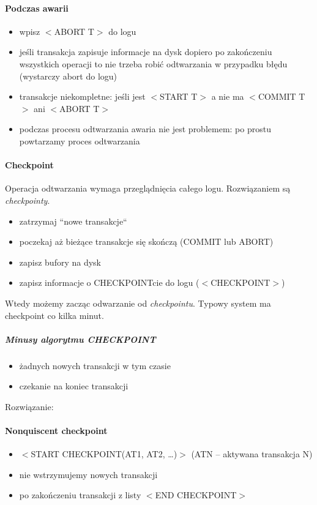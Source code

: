 \documentclass[12pt]{article}
\begin{document}
\paragraph{Podczas awarii}
\begin{itemize}
  \item wpisz $<$ABORT T$>$ do logu
  \item jeśli transakcja zapisuje informacje na dysk dopiero po zakończeniu
     wszystkich operacji to nie trzeba robić odtwarzania w przypadku błędu
     (wystarczy abort do logu)
  \item transakcje niekompletne: jeśli jest $<$START T$>$ a nie ma $<$COMMIT T$>$ ani $<$ABORT T$>$
  \item podczas procesu odtwarzania awaria nie jest problemem: po prostu powtarzamy proces
     odtwarzania
\end{itemize}

\paragraph{Checkpoint}
Operacja odtwarzania wymaga przeglądnięcia całego logu. Rozwiązaniem są \emph{checkpointy}.
\begin{itemize}
  \item zatrzymaj ``nowe transakcje``
  \item poczekaj aż bieżące transakcje się skończą (COMMIT lub ABORT)
  \item zapisz bufory na dysk
  \item zapisz informacje o CHECKPOINTcie do logu ($<$CHECKPOINT$>$)
\end{itemize}
Wtedy możemy zacząc odwarzanie od \emph{checkpointu}. Typowy system ma checkpoint co kilka minut.

\subparagraph{Minusy algorytmu CHECKPOINT}
\begin{itemize}
  \item żadnych nowych transakcji w tym czasie
  \item czekanie na koniec transakcji
\end{itemize}

  Rozwiązanie:
\paragraph{Nonquiscent checkpoint}
\begin{itemize}
  \item $<$START CHECKPOINT(AT1, AT2, \ldots)$>$ (ATN -- aktywana transakcja N)
  \item nie wstrzymujemy nowych transakcji
  \item po zakończeniu transakcji z listy $<$END CHECKPOINT$>$
\end{itemize}
\end{document}
